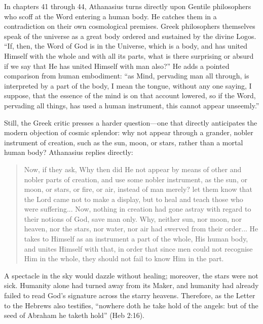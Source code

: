 In chapters 41 through 44, Athanasius turns directly upon Gentile philosophers who scoff at the Word entering a human body. He catches them in a contradiction on their own cosmological premises. Greek philosophers themselves speak of the universe as a great body ordered and sustained by the divine Logos. ``If, then, the Word of God is in the Universe, which is a body, and has united Himself with the whole and with all its parts, what is there surprising or absurd if we say that He has united Himself with man also?'' He adds a pointed comparison from human embodiment: ``as Mind, pervading man all through, is interpreted by a part of the body, I mean the tongue, without any one saying, I suppose, that the essence of the mind is on that account lowered, so if the Word, pervading all things, has used a human instrument, this cannot appear unseemly.''

Still, the Greek critic presses a harder question---one that directly anticipates the modern objection of cosmic splendor: why not appear through a grander, nobler instrument of creation, such as the sun, moon, or stars, rather than a mortal human body? Athanasius replies directly:

\begin{quote}
Now, if they ask, Why then did He not appear by means of other and nobler parts of creation, and use some nobler instrument, as the sun, or moon, or stars, or fire, or air, instead of man merely? let them know that the Lord came not to make a display, but to heal and teach those who were suffering... Now, nothing in creation had gone astray with regard to their notions of God, save man only. Why, neither sun, nor moon, nor heaven, nor the stars, nor water, nor air had swerved from their order... He takes to Himself as an instrument a part of the whole, His human body, and unites Himself with that, in order that since men could not recognise Him in the whole, they should not fail to know Him in the part.
\end{quote}

A spectacle in the sky would dazzle without healing; moreover, the stars were not sick. Humanity alone had turned away from its Maker, and humanity had already failed to read God's signature across the starry heavens. Therefore, as the Letter to the Hebrews also testifies, ``nowhere doth he take hold of the angels: but of the seed of Abraham he taketh hold'' (Heb 2:16).


